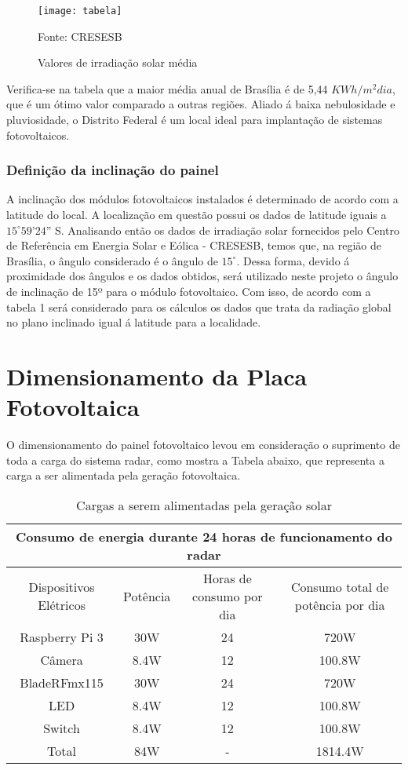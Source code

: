 \begin{figure}[h!]
\centering
\texttt{[image: tabela]}
\caption{Valores de irradiação solar média}
Fonte: CRESESB
\label{fig:tabela}
\end{figure}

Verifica-se na tabela que a maior média anual de Brasília é de 5,44 $KWh/m^2dia$, que é um ótimo valor comparado a outras regiões. Aliado á baixa nebulosidade e pluviosidade, o Distrito Federal é um local ideal para implantação de sistemas fotovoltaicos.

\subsubsection{Definição da inclinação do painel}

 A inclinação dos módulos fotovoltaicos instalados é determinado de acordo com a latitude do local. A localização em questão possui os dados de latitude iguais a $15^{\circ}59’24”$ S. Analisando então os dados de irradiação solar fornecidos pelo Centro de Referência em Energia Solar e Eólica - CRESESB, temos que, na região de Brasília, o ângulo considerado é o ângulo de $15^{\circ}$. Dessa forma, devido á proximidade dos ângulos e os dados obtidos, será utilizado neste projeto o ângulo de inclinação de 15º para o módulo fotovoltaico.
 Com isso, de acordo com a tabela 1 será considerado para os
 cálculos os dados que trata da radiação global no plano inclinado
 igual á latitude para a localidade.
 
\section{Dimensionamento da Placa Fotovoltaica}

O dimensionamento do painel fotovoltaico levou em consideração o suprimento de toda a carga do sistema radar, como mostra a Tabela abaixo, que representa a carga a ser alimentada pela geração fotovoltaica. 

\begin{table}[H]
\caption{Cargas a serem alimentadas pela geração solar}
\begin{tabular}{|c|c|c|c|}
\hline
\multicolumn{4}{|c|}{Consumo de energia durante 24 horas de funcionamento do radar}                                                 \\ \hline
Dispositivos Elétricos             & Potência         & Horas de consumo por dia & Consumo total de potência por dia \\ \hline
Raspberry Pi 3  & 30W  & 24          & 720W    \\ \hline
Câmera & 8.4W  & 12          & 100.8W \\ \hline
BladeRFmx115 & 30W  & 24          & 720W \\ \hline
LED       & 8.4W &  12 & 100.8W    \\ \hline
Switch       & 8.4W &  12 & 100.8W    \\ \hline
Total & 84W & - & 1814.4W \\ \hline

\end{tabular}
\end{table}
\FloatBarrier

